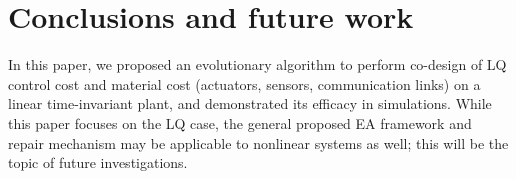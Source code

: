 \documentclass[letterpaper, 10pt, conference]{ieeeconf}
\begin{document}
\section{Conclusions and future work}
In this paper, we proposed an evolutionary algorithm to perform co-design of LQ control cost and material cost (actuators, sensors, communication links) on a linear time-invariant plant, and demonstrated its efficacy in simulations. While this paper focuses on the LQ case, the general proposed EA framework and repair mechanism may be applicable to nonlinear systems as well; this will be the topic of future investigations.



\end{document}

